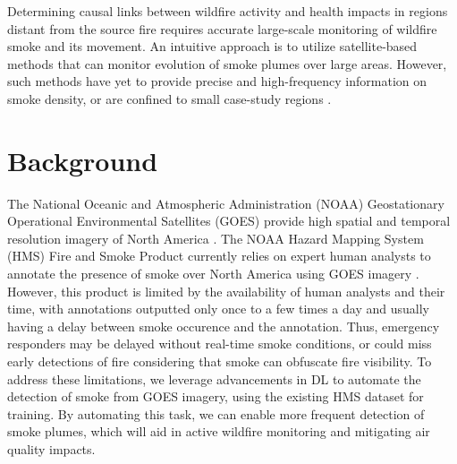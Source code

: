 \documentclass{article}
\begin{document}
Determining causal links between wildfire activity and health impacts in regions distant from the source fire requires accurate large-scale monitoring of wildfire smoke and its movement. An intuitive approach is to utilize satellite-based methods that can monitor evolution of smoke plumes over large areas. However, such methods have yet to provide precise and high-frequency information on smoke density, or are confined to small case-study regions \citep{Wen2021WildfireSP, canada-smoke-height, autralia-smoke-ml}. 


\section{Background}
The National Oceanic and Atmospheric Administration (NOAA) Geostationary Operational Environmental Satellites (GOES) provide high spatial and temporal resolution imagery of North America \citep{GOESbook}. The NOAA Hazard Mapping System (HMS) Fire and Smoke Product currently relies on expert human analysts to annotate the presence of smoke over North America using GOES imagery \citep{hms}. However, this product is limited by the availability of human analysts and their time, with annotations outputted only once to a few times a day and usually having a delay between smoke occurence and the annotation. Thus, emergency responders may be delayed without real-time smoke conditions, or could miss early detections of fire considering that smoke can obfuscate fire visibility. To address these limitations, we leverage advancements in DL to automate the detection of smoke from GOES imagery, using the existing HMS dataset for training. By automating this task, we can enable more frequent detection of smoke plumes, which will aid in active wildfire monitoring and mitigating air quality impacts.
\end{document}
